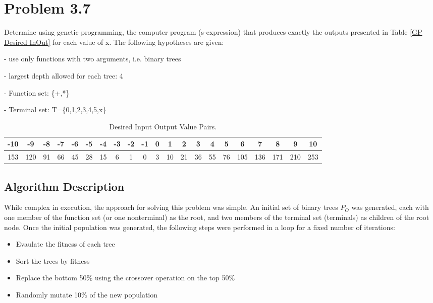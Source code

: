 \section{Problem 3.7}

Determine using genetic programming, the computer program (s-expression) that produces exactly the outputs presented in Table \ref{GP Desired InOut} for each value of x. The following hypotheses are given:

- use only functions with two arguments, i.e. binary trees

- largest depth allowed for each tree: 4

- Function set: \{+,*\}

- Terminal set: T=\{0,1,2,3,4,5,x\}

\begin{table}[tbh]
\caption{Desired Input Output Value Pairs. \label{GP Table}}
\begin{center}
\begin{tabular}{|c|c|c|c|c|c|c|c|c|c|c|c|c|c|c|c|c|c|c|c|c|}
  \hline
-10 & -9 & -8 & -7 & -6 & -5 & -4 & -3 & -2 & -1 & 0 & 1 & 2 & 3 & 4 & 5 & 6 & 7 & 8 & 9 & 10\\
\hline
153 & 120 & 91 & 66 & 45 & 28 & 15 & 6 & 1 & 0 & 3 & 10 & 21 & 36 & 55 & 76 & 105 & 136 & 171& 210 & 253\\
  \hline
\end{tabular}
\end{center}
\end{table}

\subsection{Algorithm Description}

While complex in execution, the approach for solving this problem was simple. An initial set of binary trees $P_O$ was generated, each with one member of the function set (or one nonterminal) as the root, and two members of the terminal set (terminals) as children of the root node. Once the initial population was generated, the following steps were performed in a loop for a fixed number of iterations:

\begin{itemize}
   \item  Evaulate the fitness of each tree
   \item  Sort the trees by fitness
   \item Replace the bottom 50\% using the crossover operation on the top 50\%
   \item Randomly mutate 10\% of the new population
\end{itemize}

